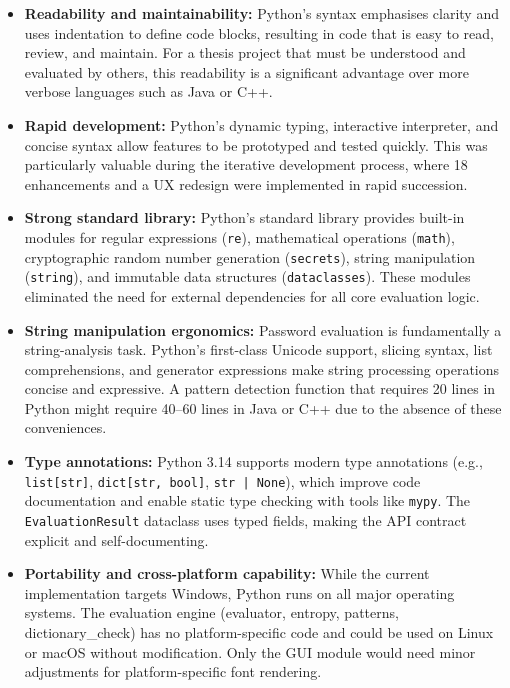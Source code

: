 \begin{itemize}
    \item \textbf{Readability and maintainability:} Python's syntax emphasises clarity and uses indentation to define code blocks, resulting in code that is easy to read, review, and maintain. For a thesis project that must be understood and evaluated by others, this readability is a significant advantage over more verbose languages such as Java or C++.

    \item \textbf{Rapid development:} Python's dynamic typing, interactive interpreter, and concise syntax allow features to be prototyped and tested quickly. This was particularly valuable during the iterative development process, where 18 enhancements and a UX redesign were implemented in rapid succession.

    \item \textbf{Strong standard library:} Python's standard library provides built-in modules for regular expressions (\texttt{re}), mathematical operations (\texttt{math}), cryptographic random number generation (\texttt{secrets}), string manipulation (\texttt{string}), and immutable data structures (\texttt{dataclasses}). These modules eliminated the need for external dependencies for all core evaluation logic.

    \item \textbf{String manipulation ergonomics:} Password evaluation is fundamentally a string-analysis task. Python's first-class Unicode support, slicing syntax, list comprehensions, and generator expressions make string processing operations concise and expressive. A pattern detection function that requires 20 lines in Python might require 40--60 lines in Java or C++ due to the absence of these conveniences.

    \item \textbf{Type annotations:} Python 3.14 supports modern type annotations (e.g., \texttt{list[str]}, \texttt{dict[str, bool]}, \texttt{str | None}), which improve code documentation and enable static type checking with tools like \texttt{mypy}. The \texttt{EvaluationResult} dataclass uses typed fields, making the API contract explicit and self-documenting.

    \item \textbf{Portability and cross-platform capability:} While the current implementation targets Windows, Python runs on all major operating systems. The evaluation engine (evaluator, entropy, patterns, dictionary\_check) has no platform-specific code and could be used on Linux or macOS without modification. Only the GUI module would need minor adjustments for platform-specific font rendering.
\end{itemize}

